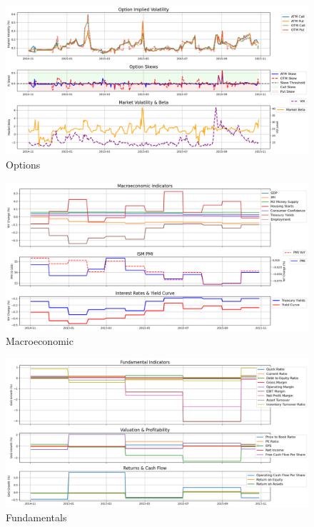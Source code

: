 \documentclass[8pt]{scrartcl}
\begin{document}
\begin{figure}[H]
    \centering
    \includegraphics[width=1\linewidth]{judge_reviews/MSFT_M_gpt-4o-mini/2015-11-01/judge_Option_Implied_Volatility.png}
    \caption{Options}
\end{figure}

\begin{figure}[H]
    \centering
    \includegraphics[width=1\linewidth]{judge_reviews/MSFT_M_gpt-4o-mini/2015-11-01/judge_Macroeconomic_Indicators.png}
    \caption{Macroeconomic}
\end{figure}

\begin{figure}[H]
    \centering
    \includegraphics[width=1\linewidth]{judge_reviews/MSFT_M_gpt-4o-mini/2015-11-01/judge_Fundamental_Indicators.png}
    \caption{Fundamentals}
\end{figure}
\end{document}
